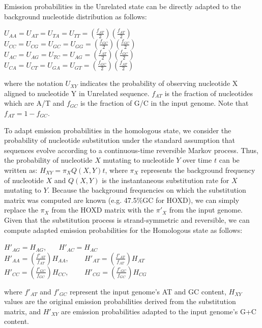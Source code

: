 Emission
probabilities in the Unrelated state can be directly adapted to the
background nucleotide distribution as follows:
\begin{center}
$U_{AA}=U_{AT}=U_{TA}=U_{TT}=(\frac{f_{AT}}{2})(\frac{f_{AT}}{2})$
$U_{CC}=U_{CG}=U_{GC}=U_{GG}=(\frac{f_{GC}}{2})(\frac{f_{GC}}{2})$
$U_{AC}=U_{AG}=U_{TC}=U_{AG}=(\frac{f_{AT}}{2})(\frac{f_{GC}}{2})$
$U_{CA}=U_{CT}=U_{GA}=U_{GT}=(\frac{f_{GC}}{2})(\frac{f_{AT}}{2})$
\end{center}
where the notation $U_{XY}$ indicates the probability of observing nucleotide X aligned to
nucleotide Y in Unrelated sequence.  $f_{AT}$ is the fraction of nucleotides which are A/T and
$f_{GC}$ is the fraction of G/C in the input genome.  Note that $f_{AT}=1-f_{GC}$.

To adapt emission probabilities in the homologous state, we consider the
probability of nucleotide substitution under the standard assumption
that sequences evolve according to a continuous-time reversible Markov process.
Thus, the probability of nucleotide $X$ mutating to nucleotide $Y$ over time $t$
can be written as: $H_{XY}=\pi_X Q(X,Y)t$, where $\pi_X$ represents the background
frequency of nucleotide $X$ and $Q(X,Y)$ is the instantaneous substitution rate for $X$
mutating to $Y$. Because the background frequencies on which the substitution matrix was computed are
known (e.g. 47.5\%GC for HOXD), we can simply replace the $\pi_X$ from the HOXD matrix
with the $\pi'_X$ from the input genome. Given that the substitution process is
strand-symmetric and reversible, we can compute adapted
emission probabilities for the Homologous state as follows:
\begin{center}
$H'_{AG}=H_{AG}$, \ \ \ $H'_{AC}=H_{AC}$ \\
$H'_{AA}=(\frac{f'_{AT}}{f_{AT}})H_{AA}$, \ \ \ \
$H'_{AT}=(\frac{f'_{AT}}{f_{AT}})H_{AT}$\\
$H'_{CC}=(\frac{f'_{GC}}{f_{GC}})H_{CC}$, \ \ \ \
$H'_{CG}=(\frac{f'_{GC}}{f_{GC}})H_{CG}$\\
\end{center}
where $f'_{AT}$ and $f'_{GC}$ represent the input genome's AT and GC content,
$H_{XY}$ values are the original emission probabilities derived from the
substitution matrix, and $H'_{XY}$ are emission probabilities adapted to
the input genome's G+C content.

%
%
%


